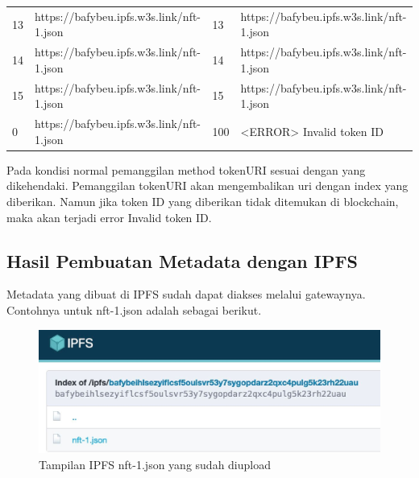 \begin{longtable}{|p{0.5in}|p{2.5in}|p{0.5in}|p{2.5in}|}
  13               & https://bafybeu.ipfs.w3s.link/nft-1.json & 13                                 & https://bafybeu.ipfs.w3s.link/nft-1.json \\
  14               & https://bafybeu.ipfs.w3s.link/nft-1.json & 14                                 & https://bafybeu.ipfs.w3s.link/nft-1.json \\
  15               & https://bafybeu.ipfs.w3s.link/nft-1.json & 15                                 & https://bafybeu.ipfs.w3s.link/nft-1.json \\
  0                & https://bafybeu.ipfs.w3s.link/nft-1.json & 100                                & <ERROR> Invalid token ID                 \\
  \hline
\end{longtable}

Pada kondisi normal pemanggilan method tokenURI sesuai dengan yang dikehendaki. Pemanggilan tokenURI akan mengembalikan uri dengan index yang diberikan.
Namun jika token ID yang diberikan tidak ditemukan di blockchain, maka akan terjadi error Invalid token ID.


\subsection{Hasil Pembuatan Metadata dengan IPFS}
Metadata yang dibuat di IPFS sudah dapat diakses melalui gatewaynya. Contohnya untuk nft-1.json adalah sebagai berikut.

\begin{figure}[H]
  \centering

  \includegraphics[scale=0.4]{gambar/nftjsonuploaded.jpg}

  \caption{Tampilan IPFS nft-1.json yang sudah diupload}
  \label{fig:ipfsjsonuploaded}
\end{figure}

